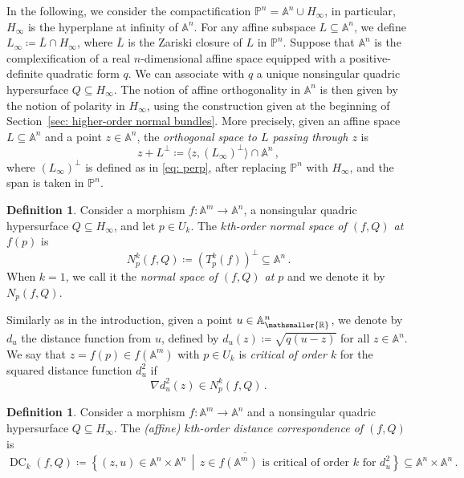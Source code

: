 \documentclass[11pt,reqno]{amsart}
\numberwithin{equation}{section}
\theoremstyle{plain}
\numberwithin{theorem}{section}
\theoremstyle{definition}
\newtheorem{definition}[theorem]{Definition}
\newcommand{\A}{\mathbb{A}}
\renewcommand{\P}{\mathbb{P}}
\newcommand{\DC}{\operatorname{DC}}
\newcommand{\mR}{\mathsmaller{\mathbb{R}}}
\begin{document}
In the following, we consider the compactification $\P^n=\A^n\cup H_\infty$, in particular, $H_\infty$ is the hyperplane at infinity of $\A^n$. For any affine subspace $L\subseteq\A^n$, we define $L_\infty\coloneqq\overline{L}\cap H_\infty$, where $\overline{L}$ is the Zariski closure of $L$ in $\P^n$.
Suppose that $\A^n$ is the complexification of a real $n$-dimensional affine space equipped with a positive-definite quadratic form $q$. We can associate with $q$ a unique nonsingular quadric hypersurface $Q\subseteq H_\infty$. The notion of affine orthogonality in $\A^n$ is then given by the notion of polarity in $H_\infty$, using the construction given at the beginning of Section~\ref{sec: higher-order normal bundles}. More precisely, given an affine space $L\subseteq\A^n$ and a point $z\in\A^n$, the {\em orthogonal space to $L$ passing through $z$} is
\[
z+L^\perp \coloneqq \langle z, (L_\infty)^\perp\rangle\cap\A^n\,,
\]
where $(L_\infty)^\perp$ is defined as in \eqref{eq: perp}, after replacing $\P^n$ with $H_\infty$, and the span is taken in $\P^n$.

\begin{definition}\label{def: affine kth order normal space}
Consider a morphism $f\colon\A^m\to\A^n$, a nonsingular quadric hypersurface $Q\subseteq H_\infty$, and let 
$p\in U_k.$
The {\em $k$th-order normal space of $(f,Q)$ at $f(p)$} is
\[
    N_p^k(f,Q) \coloneqq (T_p^k(f))^\perp \subseteq \A^n\,.
\]
When $k=1$, we call it the {\em normal space of $(f,Q)$ at $p$} and we denote it by $N_p(f,Q)$.
\end{definition}

Similarly as in the introduction, given a point $u\in\A_{\mR}^n$, we denote by $d_u$ the distance function from $u$, defined by $d_u(z)\coloneqq\sqrt{q(u-z)}$ for all $z\in\A^n$. We say that $z=f(p)\in f(\A^m)$ with $p\in U_k$ is {\em critical of order $k$} for the squared distance function $d_u^2$ if
\begin{equation}\label{eq: kth order critical affine}
    \nabla d_u^2(z)\in N_p^k(f,Q)\,.
\end{equation}

\begin{definition}\label{def: affine kth distance correspondence}
Consider a morphism $f\colon\A^m\to\A^n$ and a nonsingular quadric hypersurface $Q\subseteq H_\infty$.
The {\em (affine) $k$th-order distance correspondence of $(f,Q)$} is
\[
\DC_k(f,Q) \coloneqq \overline{\left\{(z, u) \in \A^n \times \A^n \,\middle|\, z \in f(\A^m) \text{ is critical of order } k \text{ for } d_u^2\right\}}\subseteq\A^n \times \A^n\,.
\]
\end{definition}
\end{document}
